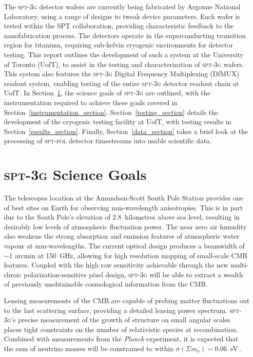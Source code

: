 \documentclass[iop]{emulateapj}
\begin{document}
The \textsc{spt-3g} detector wafers are currently being fabricated by Argonne National Laboratory, using a range of designs to tweak device parameters.  Each wafer is tested within the SPT collaboration, providing characteristic feedback to the nanofabrication process.  The detectors operate in the superconducting transition region for titanium, requiring sub-kelvin cryogenic environments for detector testing.  This report outlines the development of such a system at the University of Toronto (UofT), to assist in the testing and characterization of \textsc{spt-3g} wafers.  This system also features the \textsc{spt-3g} Digital Frequency Multiplexing (DfMUX) readout system, enabling testing of the entire \textsc{spt-3g} detector readout chain at UofT.
In Section~\ref{science_section}, the science goals of \textsc{spt-3g} are outlined, with the instrumentation required to achieve these goals covered in Section~\ref{instrumentation_section}.  Section~\ref{testing_section} details the development of the cryogenic testing facility at UofT, with testing results in Section~\ref{results_section}.  Finally, Section~\ref{data_section} takes a brief look at the processing of \textsc{spt-pol} detector timestreams into usable scientific data.



\section{\textsc{spt-3g} Science Goals}
\label{science_section}

The telescopes location at the Amundsen-Scott South Pole Station provides one of best sites on Earth for observing mm-wavelength anisotropies.  This is in part due to the South Pole's elevation of 2.8~kilometres above sea level, resulting in desirably low levels of atmospheric fluctuation power.  The near zero air humidity also weakens the strong absorption and emission features of atmospheric water vapour at mm-wavelengths.
The current optical design produces a beamwidth of $\sim$1 arcmin at 150~GHz, allowing for high resolution mapping of small-scale CMB features.  Coupled with the high raw sensitivity achievable through the new multi-chroic polarization-sensitive pixel design, \textsc{spt-3g} will be able to extract a wealth of previously unobtainable cosmological information from the CMB.

Lensing measurements of the CMB are capable of probing matter fluctuations out to the last scattering surface, providing a detailed lensing power spectrum.  \textsc{spt-3g}'s precise measurement of the growth of structure on small angular scales places tight constraints on the number of relativistic species at recombination.  Combined with measurements from the \textit{Planck} experiment, it is expected that the sum of neutrino masses will be constrained to within $\sigma(\Sigma m_{\nu})\sim0.06$~eV \citep{benson_spt-3g:_2014}.
\end{document}
